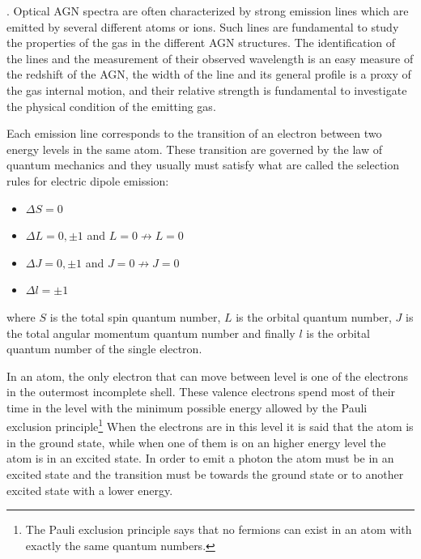 \documentclass[../thesis.tex]{subfiles}
\begin{document}
.
Optical AGN spectra are often characterized by strong emission lines which are emitted by several different atoms or ions.
Such lines are fundamental to study the properties of the gas in the different AGN structures.
The identification of the lines and the measurement of their observed wavelength is an easy measure of the redshift of the AGN, the width of the line and its general profile is a proxy of the gas internal motion, and their relative strength is fundamental to investigate the physical condition of the emitting gas.

Each emission line corresponds to the transition of an electron between two energy levels in the same atom.
These transition are governed by the law of quantum mechanics and they usually must satisfy what are called the selection rules for electric dipole emission:
\begin{itemize}
    \item $\Delta S = 0$
    \item $\Delta L = 0,\pm1$ and $L =0 \not\to L=0$
    \item $\Delta J = 0, \pm 1$ and $J=0 \not\to J=0$
    \item $\Delta l = \pm 1$
\end{itemize}
where $S$ is the total spin quantum number, $L$ is the orbital quantum number, $J$ is the total angular momentum quantum number and finally $l$ is the orbital quantum number of the single electron. 

In an atom, the only electron that can move between level is one of the electrons in the outermost incomplete shell. 
These valence electrons spend most of their time in the level with the minimum possible energy allowed by the Pauli exclusion principle\footnote{The Pauli exclusion principle says that no fermions can exist in an atom with exactly the same quantum numbers.}
When the electrons are in this level it is said that the atom is in the ground state, while when one of them is on an higher energy level the atom is in an excited state.
In order to emit a photon the atom must be in an excited state and the transition must be towards the ground state or to another excited state with a lower energy.
\end{document}
